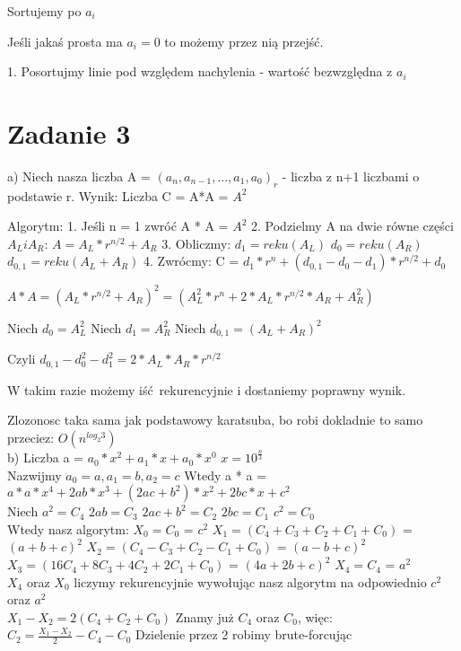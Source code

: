 \documentclass[12pt]{article}
\begin{document}
Sortujemy po $a_i$

Jeśli jakaś prosta ma $a_i = 0$ to możemy przez nią przejść.

1. Posortujmy linie pod względem nachylenia - wartość bezwzględna z $a_i$



\section{Zadanie 3}
a)
Niech nasza liczba A = $(a_n, a_{n-1}, ..., a_1, a_0)_r$ - liczba z n+1 liczbami o podstawie r.
Wynik: Liczba C = A*A = $A^2$

Algorytm:
1. Jeśli n = 1 zwróć A * A = $A^2$
2. Podzielmy A na dwie równe części $A_L i A_R$:
$A = A_L * r^{n/2} + A_R$
3. Obliczmy:
$d_1 = reku(A_L)$
$d_0 = reku(A_R)$
$d_{0, 1} = reku(A_L + A_R)$
4. Zwrócmy:
C = $d_1 * r^n + (d_{0, 1} - d_0 - d_1) * r^{n/2} + d_0$

$A*A = (A_L * r^{n/2} + A_R)^2 = (A_L^2 * r^n + 2 * A_L * r^{n/2} * A_R + A_R^2)$

Niech $d_0 = A_L^2$
Niech $d_1 = A_R^2$
Niech $d_{0, 1} = (A_L + A_R)^2$

Czyli $d_{0, 1} - d_0^2 - d_1^2 = 2 * A_L * A_R * r^{n/2}$

W takim razie możemy iść rekurencyjnie i dostaniemy poprawny wynik. 

Zlozonosc taka sama jak podstawowy karatsuba, bo robi dokladnie to samo przeciez:
$O(n^{log_2 3})$\\

b)
Liczba a = $a_0 * x^2 + a_1 * x + a_0 * x^0$ 
$x=10^{\frac{n}{3}}$\\

Nazwijmy $a_0 = a, a_1 = b, a_2 = c$
Wtedy a * a = $a*a*x^4 + 2ab * x^3 + (2ac + b^2) * x^2 + 2bc * x + c^2$\\

Niech 
$a^2 = C_4$
$2ab = C_3$
$2ac + b^2 = C_2$
$2bc = C_1$
$c^2 = C_0$\\

Wtedy nasz algorytm:
$X_0 = C_0$ = $c^2$
$X_1 = (C_4 + C_3 + C_2 + C_1 + C_0)$ = $(a+b+c)^2$
$X_2 = (C_4 - C_3 + C_2 - C_1 + C_0)$ = $(a-b+c)^2$
$X_3 = (16C_4 + 8C_3 + 4C_2 + 2C_1 + C_0)$ = $(4a+2b+c)^2$
$X_4 = C_4$ = $a^2$\\

$X_4$ oraz $X_0$ liczymy rekurencyjnie wywołując nasz algorytm na odpowiednio $c^2$ oraz $a^2$\\

$X_1 - X_2 = 2(C_4 + C_2 + C_0)$
Znamy już $C_4$ oraz $C_0$, więc:
$C_2 = \frac{X_1-X_2}{2} - C_4 - C_0$
Dzielenie przez 2 robimy brute-forcując\\
\end{document}
